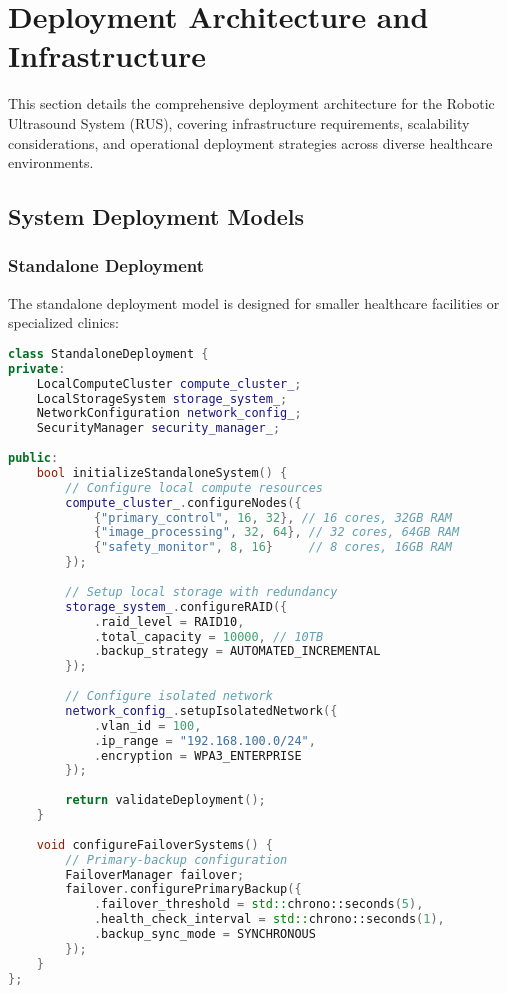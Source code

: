 \section{Deployment Architecture and Infrastructure}
\label{sec:deployment-architecture}

This section details the comprehensive deployment architecture for the Robotic Ultrasound System (RUS), covering infrastructure requirements, scalability considerations, and operational deployment strategies across diverse healthcare environments.

\subsection{System Deployment Models}

\subsubsection{Standalone Deployment}
The standalone deployment model is designed for smaller healthcare facilities or specialized clinics:

\begin{lstlisting}[language=C++, caption={Standalone Deployment Configuration}, label={lst:standalone-deployment}]
class StandaloneDeployment {
private:
    LocalComputeCluster compute_cluster_;
    LocalStorageSystem storage_system_;
    NetworkConfiguration network_config_;
    SecurityManager security_manager_;
    
public:
    bool initializeStandaloneSystem() {
        // Configure local compute resources
        compute_cluster_.configureNodes({
            {"primary_control", 16, 32}, // 16 cores, 32GB RAM
            {"image_processing", 32, 64}, // 32 cores, 64GB RAM
            {"safety_monitor", 8, 16}     // 8 cores, 16GB RAM
        });
        
        // Setup local storage with redundancy
        storage_system_.configureRAID({
            .raid_level = RAID10,
            .total_capacity = 10000, // 10TB
            .backup_strategy = AUTOMATED_INCREMENTAL
        });
        
        // Configure isolated network
        network_config_.setupIsolatedNetwork({
            .vlan_id = 100,
            .ip_range = "192.168.100.0/24",
            .encryption = WPA3_ENTERPRISE
        });
        
        return validateDeployment();
    }
    
    void configureFailoverSystems() {
        // Primary-backup configuration
        FailoverManager failover;
        failover.configurePrimaryBackup({
            .failover_threshold = std::chrono::seconds(5),
            .health_check_interval = std::chrono::seconds(1),
            .backup_sync_mode = SYNCHRONOUS
        });
    }
};
\end{lstlisting}

